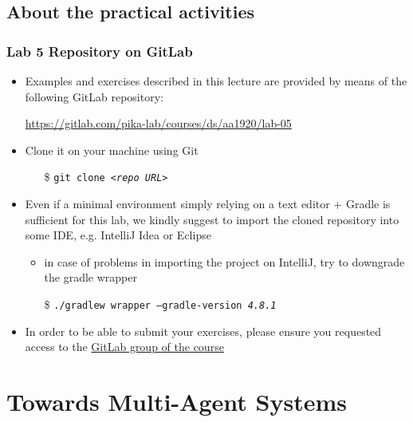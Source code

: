\documentclass[presentation]{beamer}\mode<presentation>{\usetheme{AMSCesenaPurpleAndGold}}
\begin{document}
\subsection{About the practical activities}

\begin{frame}
\frametitle{Lab 5 Repository on GitLab}

	\begin{itemize}
		\item Examples and exercises described in this lecture are provided by means of the following GitLab repository:
		\begin{center}
			\url{https://gitlab.com/pika-lab/courses/ds/aa1920/lab-05}
		\end{center}
		
		\vfill
		
		\item Clone it on your machine using Git
		\begin{itemize}
		    \item[\$] \texttt{git clone \textit{<repo URL>}}
		\end{itemize}
		
		\vfill
		
		\item Even if a minimal environment simply relying on a text editor + Gradle is sufficient for this lab, we kindly suggest to import the cloned repository into some IDE, e.g. IntelliJ Idea or Eclipse
		\begin{itemize}
		    \item in case of problems in importing the project on IntelliJ, try to downgrade the gradle wrapper
		    \item[\$] \texttt{./gradlew wrapper \alert{--gradle-version \textit{4.8.1}}}
		\end{itemize}
		
		\vfill
		
		\item In order to be able to submit your exercises, please ensure you requested access to the \href{https://gitlab.com/pika-lab/courses/ds/aa1920}{GitLab group of the course}
	\end{itemize}

\end{frame}

\section{Towards Multi-Agent Systems}
\end{document}

